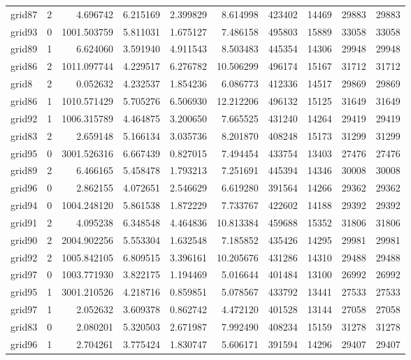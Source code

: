 \begin{longtable}{|l|r|r|r|r|r|r|r|r|r|}
grid87 & 2 & 4.696742 & 6.215169 & 2.399829 & 8.614998 & 423402 & 14469 & 29883 & 29883 \\
grid93 & 0 & 1001.503759 & 5.811031 & 1.675127 & 7.486158 & 495803 & 15889 & 33058 & 33058 \\
grid89 & 1 & 6.624060 & 3.591940 & 4.911543 & 8.503483 & 445354 & 14306 & 29948 & 29948 \\
grid86 & 2 & 1011.097744 & 4.229517 & 6.276782 & 10.506299 & 496174 & 15167 & 31712 & 31712 \\
grid8 & 2 & 0.052632 & 4.232537 & 1.854236 & 6.086773 & 412336 & 14517 & 29869 & 29869 \\
grid86 & 1 & 1010.571429 & 5.705276 & 6.506930 & 12.212206 & 496132 & 15125 & 31649 & 31649 \\
grid92 & 1 & 1006.315789 & 4.464875 & 3.200650 & 7.665525 & 431240 & 14264 & 29419 & 29419 \\
grid83 & 2 & 2.659148 & 5.166134 & 3.035736 & 8.201870 & 408248 & 15173 & 31299 & 31299 \\
grid95 & 0 & 3001.526316 & 6.667439 & 0.827015 & 7.494454 & 433754 & 13403 & 27476 & 27476 \\
grid89 & 2 & 6.466165 & 5.458478 & 1.793213 & 7.251691 & 445394 & 14346 & 30008 & 30008 \\
grid96 & 0 & 2.862155 & 4.072651 & 2.546629 & 6.619280 & 391564 & 14266 & 29362 & 29362 \\
grid94 & 0 & 1004.248120 & 5.861538 & 1.872229 & 7.733767 & 422602 & 14188 & 29392 & 29392 \\
grid91 & 2 & 4.095238 & 6.348548 & 4.464836 & 10.813384 & 459688 & 15352 & 31806 & 31806 \\
grid90 & 2 & 2004.902256 & 5.553304 & 1.632548 & 7.185852 & 435426 & 14295 & 29981 & 29981 \\
grid92 & 2 & 1005.842105 & 6.809515 & 3.396161 & 10.205676 & 431286 & 14310 & 29488 & 29488 \\
grid97 & 0 & 1003.771930 & 3.822175 & 1.194469 & 5.016644 & 401484 & 13100 & 26992 & 26992 \\
grid95 & 1 & 3001.210526 & 4.218716 & 0.859851 & 5.078567 & 433792 & 13441 & 27533 & 27533 \\
grid97 & 1 & 2.052632 & 3.609378 & 0.862742 & 4.472120 & 401528 & 13144 & 27058 & 27058 \\
grid83 & 0 & 2.080201 & 5.320503 & 2.671987 & 7.992490 & 408234 & 15159 & 31278 & 31278 \\
grid96 & 1 & 2.704261 & 3.775424 & 1.830747 & 5.606171 & 391594 & 14296 & 29407 & 29407 \\

\end{longtable}
